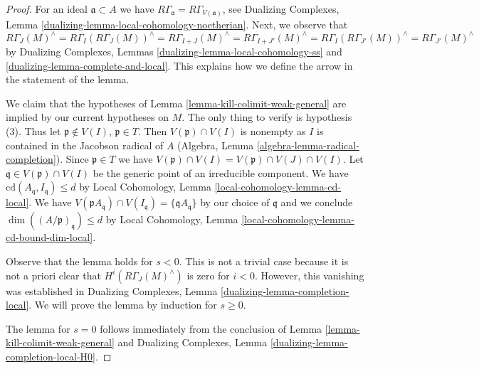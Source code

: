 \begin{proof}
For an ideal $\mathfrak a \subset A$ we have
$R\Gamma_\mathfrak a = R\Gamma_{V(\mathfrak a)}$, see
Dualizing Complexes, Lemma \ref{dualizing-lemma-local-cohomology-noetherian}.
Next, we observe that
$$
R\Gamma_J(M)^\wedge =
R\Gamma_I(R\Gamma_J(M))^\wedge =
R\Gamma_{I + J}(M)^\wedge =
R\Gamma_{I + J'}(M)^\wedge =
R\Gamma_I(R\Gamma_{J'}(M))^\wedge =
R\Gamma_{J'}(M)^\wedge
$$
by Dualizing Complexes, Lemmas \ref{dualizing-lemma-local-cohomology-ss} and
\ref{dualizing-lemma-complete-and-local}.
This explains how we define the arrow in the statement of the lemma.

\medskip\noindent
We claim that the hypotheses of Lemma \ref{lemma-kill-colimit-weak-general}
are implied by our current hypotheses on $M$.
The only thing to verify is hypothesis (3).
Thus let $\mathfrak p \not \in V(I)$, $\mathfrak p \in T$.
Then $V(\mathfrak p) \cap V(I)$ is nonempty as $I$ is
contained in the Jacobson radical of $A$
(Algebra, Lemma \ref{algebra-lemma-radical-completion}).
Since $\mathfrak p \in T$ we have
$V(\mathfrak p) \cap V(I) = V(\mathfrak p) \cap V(J) \cap V(I)$.
Let $\mathfrak q \in V(\mathfrak p) \cap V(I)$ be the
generic point of an irreducible component.
We have $\text{cd}(A_\mathfrak q, I_\mathfrak q) \leq d$
by Local Cohomology, Lemma \ref{local-cohomology-lemma-cd-local}.
We have $V(\mathfrak pA_\mathfrak q) \cap V(I_\mathfrak q) =
\{\mathfrak qA_\mathfrak q\}$ by our choice of $\mathfrak q$
and we conclude $\dim((A/\mathfrak p)_\mathfrak q) \leq d$
by Local Cohomology, Lemma \ref{local-cohomology-lemma-cd-bound-dim-local}.

\medskip\noindent
Observe that the lemma holds for $s < 0$. This is not a trivial case because
it is not a priori clear that $H^i(R\Gamma_J(M)^\wedge)$
is zero for $i < 0$. However, this vanishing was established in
Dualizing Complexes, Lemma \ref{dualizing-lemma-completion-local}.
We will prove the lemma by induction for $s \geq 0$.

\medskip\noindent
The lemma for $s = 0$ follows immediately from
the conclusion of Lemma \ref{lemma-kill-colimit-weak-general}
and Dualizing Complexes, Lemma \ref{dualizing-lemma-completion-local-H0}.


\end{proof}

